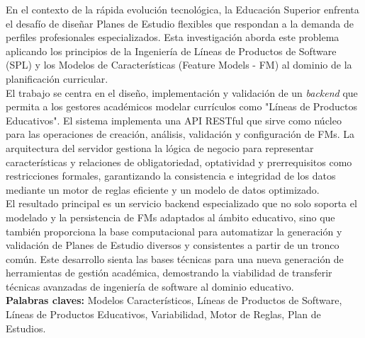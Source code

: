 \ResumenAbstract
{
En el contexto de la rápida evolución tecnológica, la Educación Superior enfrenta el
desafío de diseñar Planes de Estudio flexibles que respondan a la demanda de
perfiles profesionales especializados. Esta investigación aborda este problema
aplicando los principios de la Ingeniería de Líneas de Productos de Software (SPL) y
los Modelos de Características (Feature Models - FM) al dominio de la planificación
curricular.\\
El trabajo se centra en el diseño, implementación y validación de un \textit{backend} que
permita a los gestores académicos modelar currículos como "Líneas de Productos
Educativos". El sistema implementa una API RESTful que sirve como núcleo para las
operaciones de creación, análisis, validación y configuración de FMs. La arquitectura
del servidor gestiona la lógica de negocio para representar
características y relaciones de obligatoriedad, optatividad y prerrequisitos como
restricciones formales, garantizando la consistencia e integridad de los datos
mediante un motor de reglas eficiente y un modelo de datos optimizado.\\
El resultado principal es un servicio backend especializado que no solo soporta el
modelado y la persistencia de FMs adaptados al ámbito educativo, sino que también
proporciona la base computacional para automatizar la generación y validación de
Planes de Estudio diversos y consistentes a partir de un tronco común. Este
desarrollo sienta las bases técnicas para una nueva generación de herramientas de
gestión académica, demostrando la viabilidad de transferir técnicas avanzadas de
ingeniería de software al dominio educativo.\\
\textbf{Palabras claves:} Modelos Característicos, Líneas de Productos de
Software, Líneas de Productos Educativos, Variabilidad, Motor de Reglas, Plan de Estudios.
}
